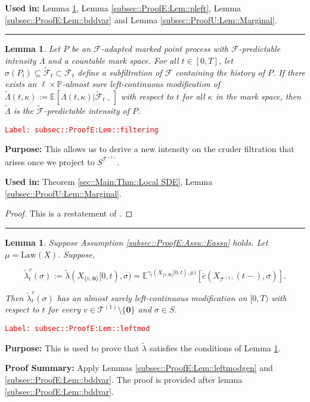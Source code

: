 \documentclass[12pt]{article}
\newcommand{\mb}{\mathbb}
\newcommand{\mc}{\mathcal}
\newcommand{\ov}{\overline}
\newcommand{\te}{\text}
\newcommand{\tr}{\textcolor{red}}
\newcommand{\labe}[1]{\tr{\texttt{Label: #1}}}
\newcommand{\purpose}{\textbf{Purpose: }}
\newcommand{\pfsum}{\textbf{Proof Summary: }}
\newcommand{\usein}{\textbf{Used in: }}
\newcommand{\lin}{\rule{\linewidth}{0.4 pt}}
\newcommand{\pr}{\mb{P}}							%
\newcommand{\ex}[1]{\mb{E}\left[#1\right]}			%
\newcommand{\exmu}[2]{\mb{E}^{#1}\left[#2\right]}	%
\renewcommand{\root}{\mathbf{0}}				%
\renewcommand{\v}{v}							%
\renewcommand{\S}{S}							%
\newcommand{\s}{\sigma}							%
\newcommand{\T}{T}								%
\renewcommand{\t}{t}							%
\newcommand{\F}{\mc{F}}							%
\newcommand{\X}{X}								%
\newcommand{\vind}[1]{^{#1}}					%
\newcommand{\carp}[1]{^{#1}}					%
\newcommand{\cind}[1]{_{#1}}					%
\newcommand{\tp}[1]{(#1)}						%
\newcommand{\tip}[1]{#1}						%
\newcommand{\ts}[1]{_{#1}}						%
\newcommand{\IGrg}{\ov{c}}						%
\newcommand{\tree}{\mc{T}}						%
\newcommand{\sln}[1]{^{(#1)}}					%
\newcommand{\Sm}{\ell}							%
\newcommand{\alt}[1]{\widetilde{#1}}			%
\newcommand{\m}{\mu}							%
\newcommand{\cm}{\gamma}						%
\newcommand{\law}{\te{Law}}						%
\renewcommand{\mark}{\kappa}					%
\newcommand{\rp}{P}								%
\newcommand{\ratee}{\Lambda}					%
\newcommand{\crate}{\alt{\lambda}}				%
\newcommand{\cratee}{\alt{\Lambda}} 			%
\newtheorem{lem}[thms]{Lemma}
\begin{document}
\usein Lemma \ref{subsec::ProofE:Lem::leftmod}, Lemma \ref{subsec::ProofE:Lem::pleft}, Lemma \ref{subsec::ProofE:Lem::bddvar} and Lemma \ref{subsec::ProofU:Lem::Marginal}.

\lin

\begin{lem}
Let \(\rp\) be an \(\F\)-adapted marked point process with \(\F\)-predictable intensity \(\ratee\) and a countable mark space. For all \(\t \in [0,\T]\), let \(\sigma(\rp\ts{\t}) \subseteq \alt{\F}\ts{\t}\subset \F\ts{\t}\) define a subfiltration of \(\F\) containing the history of \(\rp\). If there exists an \(\Sm\times \pr\)-almost sure left-continuous modification of \(\cratee(\t,\mark) := \ex{\ratee(\t,\mark)|\alt{\F}\ts{\t-}}\) with respect to \(\t\) for all \(\mark\) in the mark space, then \(\cratee\) is the \(\alt{\F}\)-predictable intensity of \(\rp\).
\label{subsec::ProofE:Lem::filtering}
\end{lem}
\labe{subsec::ProofE:Lem::filtering}

\purpose This allows us to derive a new intensity on the cruder filtration that arises once we project to \(\S\carp{\tree\sln{1}}\).

\usein Theorem \ref{sec::Main:Thm::Local SDE}, Lemma \ref{subsec::ProofU:Lem::Marginal}.

\begin{proof}
This is a restatement of \cite[Theorem 14.3.III]{DalVer08}.
\end{proof}

\lin

\begin{lem}
Suppose Assumption \ref{subsec::ProofE:Assu::Eassu} holds. Let \(\m = \law(\X)\). Suppose,

\[\crate\vind{\v}\ts{\t}(\s) := \crate(\X\cind{\{\v,\root\}}\tip{[0,\t)},\s) = \exmu{\cm\ts{\t}(\X\cind{\{\v,\root\}}\tip{[0,\t)},\m)}{\IGrg(\X\cind{\tree\sln{1}}\tp{\t-},\s)}.\]


Then \(\crate\vind{\v}\ts{\t}(\s)\) has an almost surely left-continuous modification on \([0,\T)\) with respect to \(\t\) for every \(\v \in \tree\sln{1}\setminus\{\root\}\) and \(\s \in \S\).
\label{subsec::ProofE:Lem::leftmod}
\end{lem}
\labe{subsec::ProofE:Lem::leftmod}

\purpose This is used to prove that \(\crate\) satisfies the conditions of Lemma \ref{subsec::ProofE:Lem::filtering}.

\pfsum Apply Lemmas \ref{subsec::ProofE:Lem::leftmodgen} and \ref{subsec::ProofE:Lem::bddvar}. The proof is provided after lemma \ref{subsec::ProofE:Lem::bddvar}.
\end{document}
